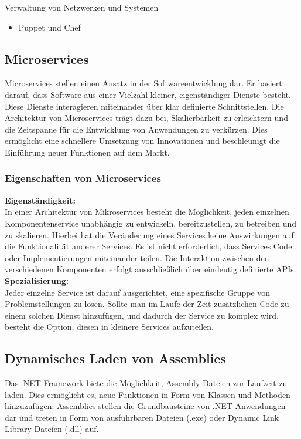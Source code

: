 Verwaltung von Netzwerken und Systemen
\begin{itemize}
    \item Puppet und Chef
\end{itemize}

\newpage
\subsection*{Microservices}

Microservices stellen einen Ansatz in der Softwareentwicklung dar. Er basiert darauf, 
dass Software aus einer Vielzahl kleiner, eigenständiger Dienste besteht. 
Diese Dienste interagieren miteinander über klar definierte Schnittstellen.
Die Architektur von Microservices trägt dazu bei, Skalierbarkeit zu erleichtern und die 
Zeitspanne für die Entwicklung von Anwendungen zu verkürzen. 
Dies ermöglicht eine schnellere Umsetzung von Innovationen und beschleunigt die Einführung 
neuer Funktionen auf dem Markt.

\subsubsection*{Eigenschaften von Microservices}

\textbf{Eigenständigkeit:}\\
In einer Architektur von Mikroservices besteht die Möglichkeit, jeden einzelnen Komponentenservice 
unabhängig zu entwickeln, bereitzustellen, zu betreiben und zu skalieren. 
Hierbei hat die Veränderung eines Services keine Auswirkungen auf die Funktionalität anderer Services. 
Es ist nicht erforderlich, dass Services Code oder Implementierungen miteinander teilen. 
Die Interaktion zwischen den verschiedenen Komponenten erfolgt ausschließlich 
über eindeutig definierte APIs.\\

\textbf{Spezialisierung:}\\
Jeder einzelne Service ist darauf ausgerichtet, eine spezifische Gruppe von 
Problemstellungen zu lösen. Sollte man im Laufe der Zeit zusätzlichen Code zu einem 
solchen Dienst hinzufügen, und dadurch der Service zu komplex wird, besteht die Option, 
diesen in kleinere Services aufzuteilen.

\newpage
\subsection*{Dynamisches Laden von Assemblies}

Das .NET-Framework biete die Möglichkeit, Assembly-Dateien zur Laufzeit zu laden. 
Dies ermöglicht es, neue Funktionen in Form von Klassen und Methoden hinzuzufügen. 
Assemblies stellen die Grundbausteine von .NET-Anwendungen dar und treten in Form 
von ausführbaren Dateien (.exe) oder Dynamic Link Library-Dateien (.dll) auf.\\

